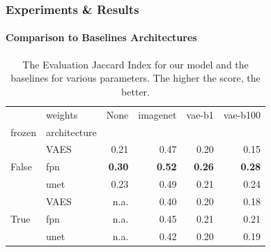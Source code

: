 \documentclass[t,aspectratio=169]{beamer}
\begin{document}
\begin{frame}[fragile]
  \frametitle{Experiments \& Results}
  \framesubtitle{Comparison to Baselines Architectures}
  \vspace*{-0.5cm}
  \begin{table}
    \centering
    \caption{The Evaluation Jaccard Index for our model and the baselines for various parameters. The higher the score, the better.}
    \color{black}
    \begin{tabular}{llrrrr}
      \toprule
                                & weights      & None          & imagenet      & vae-b1        & vae-b100      \\
      frozen                    & architecture &               &               &               &               \\
      \midrule
      \multirow[t]{3}{*}{False} & VAES         & 0.21          & 0.47          & 0.20          & 0.15          \\
                                & fpn          & \textbf{0.30} & \textbf{0.52} & \textbf{0.26} & \textbf{0.28} \\
                                & unet         & 0.23          & 0.49          & 0.21          & 0.24          \\
      \cline{1-6}
      \multirow[t]{3}{*}{True}  & VAES         & n.a.          & 0.40          & 0.20          & 0.18          \\
                                & fpn          & n.a.          & 0.45          & 0.21          & 0.21          \\
                                & unet         & n.a.          & 0.42          & 0.20          & 0.19          \\
      \cline{1-6}
      \bottomrule
    \end{tabular}
    
  \end{table}
  
  
  
\end{frame}
\end{document}
